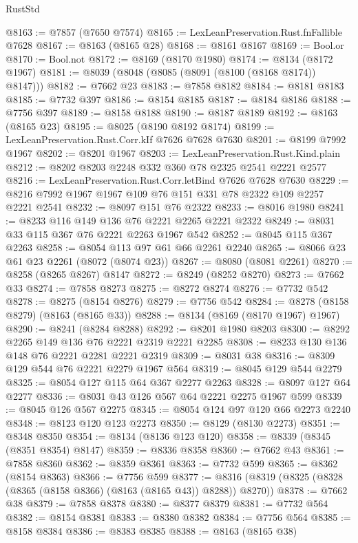 \begin{lexlean}{RustStd}
\begin{coremodule}
@8163 := @7857 (@7650 @7574)
@8165 := LexLeanPreservation.Rust.fnFallible @7628
@8167 := @8163 (@8165 @28)
@8168 := @8161 @8167
@8169 := Bool.or
@8170 := Bool.not
@8172 := @8169 (@8170 @1980)
@8174 := @8134 (@8172 @1967)
@8181 := @8039 (@8048 (@8085 (@8091 (@8100 (@8168 @8174)) @8147)))
@8182 := @7662 @23
@8183 := @7858 @8182
@8184 := @8181 @8183
@8185 := @7732 @397
@8186 := @8154 @8185
@8187 := @8184 @8186
@8188 := @7756 @397
@8189 := @8158 @8188
@8190 := @8187 @8189
@8192 := @8163 (@8165 @23)
@8195 := @8025 (@8190 @8192 @8174)
@8199 := LexLeanPreservation.Rust.Corr.kIf @7626 @7628 @7630
@8201 := @8199 @7992 @1967
@8202 := @8201 @1967
@8203 := LexLeanPreservation.Rust.Kind.plain
@8212 := @8202 @8203 @2248 @332 @360 @78 @2325 @2541 @2221 @2577
@8216 := LexLeanPreservation.Rust.Corr.letBind @7626 @7628 @7630
@8229 := @8216 @7992 @1967 @1967 @109 @76 @151 @331 @78 @2322 @109 @2257 @2221 @2541
@8232 := @8097 @151 @76 @2322
@8233 := @8016 @1980
@8241 := @8233 @116 @149 @136 @76 @2221 @2265 @2221 @2322
@8249 := @8031 @33 @115 @367 @76 @2221 @2263 @1967 @542
@8252 := @8045 @115 @367 @2263
@8258 := @8054 @113 @97 @61 @66 @2261 @2240
@8265 := @8066 @23 @61 @23 @2261 (@8072 (@8074 @23))
@8267 := @8080 (@8081 @2261)
@8270 := @8258 (@8265 @8267) @8147
@8272 := @8249 (@8252 @8270)
@8273 := @7662 @33
@8274 := @7858 @8273
@8275 := @8272 @8274
@8276 := @7732 @542
@8278 := @8275 (@8154 @8276)
@8279 := @7756 @542
@8284 := @8278 (@8158 @8279) (@8163 (@8165 @33))
@8288 := @8134 (@8169 (@8170 @1967) @1967)
@8290 := @8241 (@8284 @8288)
@8292 := @8201 @1980 @8203
@8300 := @8292 @2265 @149 @136 @76 @2221 @2319 @2221 @2285
@8308 := @8233 @130 @136 @148 @76 @2221 @2281 @2221 @2319
@8309 := @8031 @38
@8316 := @8309 @129 @544 @76 @2221 @2279 @1967 @564
@8319 := @8045 @129 @544 @2279
@8325 := @8054 @127 @115 @64 @367 @2277 @2263
@8328 := @8097 @127 @64 @2277
@8336 := @8031 @43 @126 @567 @64 @2221 @2275 @1967 @599
@8339 := @8045 @126 @567 @2275
@8345 := @8054 @124 @97 @120 @66 @2273 @2240
@8348 := @8123 @120 @123 @2273
@8350 := @8129 (@8130 @2273)
@8351 := @8348 @8350
@8354 := @8134 (@8136 @123 @120)
@8358 := @8339 (@8345 (@8351 @8354) @8147)
@8359 := @8336 @8358
@8360 := @7662 @43
@8361 := @7858 @8360
@8362 := @8359 @8361
@8363 := @7732 @599
@8365 := @8362 (@8154 @8363)
@8366 := @7756 @599
@8377 := @8316 (@8319 (@8325 (@8328 (@8365 (@8158 @8366) (@8163 (@8165 @43)) @8288)) @8270))
@8378 := @7662 @38
@8379 := @7858 @8378
@8380 := @8377 @8379
@8381 := @7732 @564
@8382 := @8154 @8381
@8383 := @8380 @8382
@8384 := @7756 @564
@8385 := @8158 @8384
@8386 := @8383 @8385
@8388 := @8163 (@8165 @38)

\end{coremodule}
\end{lexlean}

